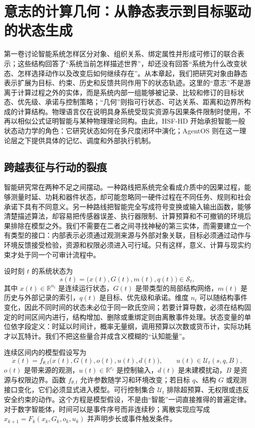 \chapter{意志的计算几何：从静态表示到目标驱动的状态生成}
\label{chp:will_geometry}

第一卷讨论智能系统怎样区分对象、组织关系、绑定属性并形成可修订的联合表示；这些结构回答了“系统当前怎样描述世界”，却还没有回答“系统为什么改变状态、怎样选择动作以及改变后如何继续存在”。从本章起，我们把研究对象由静态表示扩展为目标、约束、历史和反馈共同作用下的状态轨迹。这里的“意志”不是游离于计算过程之外的实体，而是系统内部一组能够被记录、比较和修订的目标状态、优先级、承诺与控制策略；“几何”则指可行状态、可达关系、距离和边界所构成的计算结构。物理语言仅在说明具身系统受现实资源与因果条件限制时使用，不再以相似公式证明智能与某种物理理论同构。由此，HSF-HD 开始承担智能一般状态动力学的角色：它研究状态如何在多尺度闭环中演化；AgentOS 则在这一理论层之下提供具体的记忆、调度和外部执行机制。

\section{跨越表征与行动的裂痕}
\label{sec:section_443}

智能研究常在两种不足之间摆动。一种路线把系统完全看成介质中的因果过程，能够测量时延、功耗和器件状态，却可能忽略同一硬件过程在不同任务、规则和社会承诺下具有不同意义。另一种路线把智能完全写成符号变换或输入输出函数，能够清楚描述算法，却容易把传感器误差、执行器限制、计算预算和不可撤销的环境后果排除在模型之外。我们不需要在二者之间寻找神秘的第三实体，而需要建立一个有类型的接口：内部表示必须通过观测来源与外部对象关联，目标必须通过动作与环境反馈接受检验，资源和权限必须进入可行域。只有这样，意义、计算与现实约束才处于同一个可审计流程中。

设时刻 $t$ 的系统状态为
\begin{equation}
  s(t)=\bigl(x(t),G(t),m(t),q(t)\bigr)\in\mathcal S_t,
\end{equation}
其中 $x(t)\in\mathbb R^{n_t}$ 是连续运行状态，$G(t)$ 是带类型的局部结构网络，$m(t)$ 是历史与外部记录的索引，$q(t)$ 是目标、优先级和承诺。维度 $n_t$ 可以随结构事件变化，因此不同时间的状态未必位于同一欧氏空间；若要计算导数，必须在结构固定的时间区间内进行，结构增加、删除或重绑定则由离散事件处理。状态变量的单位依字段定义：时延以时间计，概率无量纲，调用预算以次数或货币计，实际功耗才以瓦特计。我们不把这些量合并成含义模糊的“认知能量”。

连续区间内的模型假设写为
\begin{equation}
  \dot x(t)=f_{\theta,t}\bigl(x(t),G(t),o(t),u(t),d(t)\bigr),
  \qquad u(t)\in\mathcal U_t(s,q,B),
\end{equation}
$o(t)$ 是带来源的观测，$u(t)\in\mathbb R^{r_t}$ 是控制输入，$d(t)$ 是未建模扰动，$B$ 是资源与权限边界。函数 $f_{\theta,t}$ 允许参数随学习和环境改变；若目标 $q$、结构 $G$ 或观测接口变化，它们必须显式进入模型。可行控制集合 $\mathcal U_t$ 排除超预算、无权限或违反安全约束的动作。这个方程是模型假设，不是由“智能”一词直接推得的普遍定律。对于数字智能体，时间可以是事件序号而非连续秒；离散实现应写成 $x_{k+1}=F_k(x_k,G_k,o_k,u_k)$ 并声明步长或事件触发条件。

